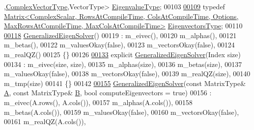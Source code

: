 \begin{DoxyCode}
      ,\hyperlink{group___eigenvalues___module_acfd144329aca76882069da2fc5d53ef5}{ComplexVectorType},VectorType> \hyperlink{group___eigenvalues___module_ad59af178acc401f1bc4e330ef80f286d}{EigenvalueType};
00103 
\hyperlink{group___eigenvalues___module_afffec018dbb2d87b4c09b6acecbb79cd}{00109}     \textcolor{keyword}{typedef} 
      \hyperlink{group___core___module}{Matrix<ComplexScalar, RowsAtCompileTime, ColsAtCompileTime, Options, MaxRowsAtCompileTime,
       MaxColsAtCompileTime>}
       \hyperlink{group___eigenvalues___module_afffec018dbb2d87b4c09b6acecbb79cd}{EigenvectorsType};
00110 
\hyperlink{group___eigenvalues___module_ae745f39da43f9df192cc2875d82b4cf1}{00118}     \hyperlink{group___eigenvalues___module_ae745f39da43f9df192cc2875d82b4cf1}{GeneralizedEigenSolver}()
00119       : m\_eivec(),
00120         m\_alphas(),
00121         m\_betas(),
00122         m\_valuesOkay(false),
00123         m\_vectorsOkay(false),
00124         m\_realQZ()
00125     \{\}
00126 
\hyperlink{group___eigenvalues___module_aab6423ded30275cd4cdd31758c278694}{00133}     \textcolor{keyword}{explicit} \hyperlink{group___eigenvalues___module_aab6423ded30275cd4cdd31758c278694}{GeneralizedEigenSolver}(Index size)
00134       : m\_eivec(size, size),
00135         m\_alphas(size),
00136         m\_betas(size),
00137         m\_valuesOkay(false),
00138         m\_vectorsOkay(false),
00139         m\_realQZ(size),
00140         m\_tmp(size)
00141     \{\}
00142 
\hyperlink{group___eigenvalues___module_a2a3528cbf75f66d3a60af9dc7b12ff65}{00155}     \hyperlink{group___eigenvalues___module_a2a3528cbf75f66d3a60af9dc7b12ff65}{GeneralizedEigenSolver}(\textcolor{keyword}{const} MatrixType& \hyperlink{group___core___module_class_eigen_1_1_matrix}{A}, \textcolor{keyword}{const} MatrixType& 
      \hyperlink{group___core___module_class_eigen_1_1_matrix}{B}, \textcolor{keywordtype}{bool} computeEigenvectors = \textcolor{keyword}{true})
00156       : m\_eivec(A.rows(), A.cols()),
00157         m\_alphas(A.cols()),
00158         m\_betas(A.cols()),
00159         m\_valuesOkay(false),
00160         m\_vectorsOkay(false),
00161         m\_realQZ(A.cols()),

\end{DoxyCode}
